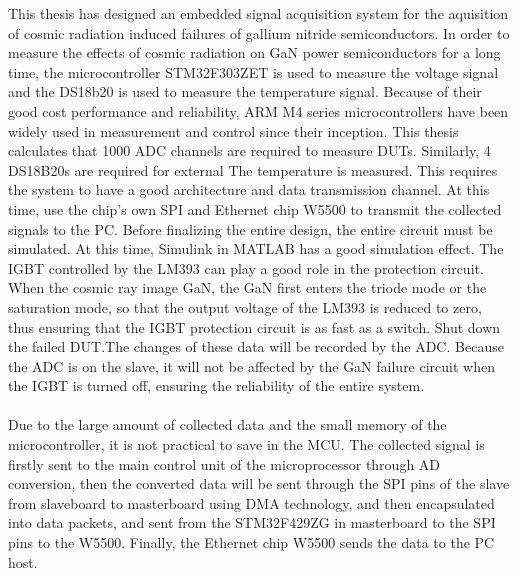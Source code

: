 This thesis has designed an embedded signal acquisition system for the aquisition of cosmic radiation induced failures of  gallium nitride semiconductors. 
In order to measure the effects of cosmic radiation on GaN power semiconductors for a long time, the microcontroller STM32F303ZET is used to measure the voltage signal and the DS18b20 is used to measure the temperature signal. Because of their good cost performance and reliability, ARM M4 series microcontrollers have been widely used in measurement and control since their inception. This thesis calculates that 1000 ADC channels are required to measure DUTs. Similarly, 4 DS18B20s are required for external The temperature is measured. This requires the system to have a good architecture and data transmission channel. At this time, use the chip's own SPI and Ethernet chip W5500 to transmit the collected signals to the PC. Before finalizing the entire design, the entire circuit must be simulated. At this time, Simulink in MATLAB has a good simulation effect. The IGBT controlled by the LM393 can play a good role in the protection circuit. When the cosmic ray image GaN, the GaN first enters the triode mode or the saturation mode, so that the output voltage of the LM393 is reduced to zero, thus ensuring that the IGBT protection circuit is as fast as a switch. Shut down the failed DUT.The changes of these data will be recorded by the ADC. Because the ADC is on the slave, it will not be affected by the GaN failure circuit when the IGBT is turned off, ensuring the reliability of the entire system.
\\
\\
Due to the large amount of collected data and the small memory of the microcontroller, it is not practical to save in the MCU. The collected signal is firstly sent to the main control unit of the microprocessor through AD conversion, then the converted data will be sent through the SPI pins of the slave from slaveboard to masterboard using DMA technology, and then encapsulated into data packets, and sent from the STM32F429ZG in masterboard to the SPI pins to the W5500. Finally, the Ethernet chip W5500 sends the data to the PC host. 
\\
\\

